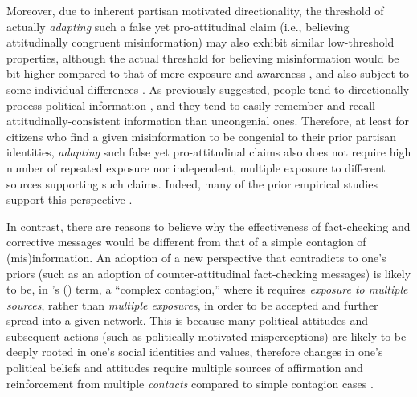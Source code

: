 \documentclass[man, 12pt, a4paper, noextraspace]{apa6}
\begin{document}
    Moreover, due to inherent partisan motivated directionality, the threshold of actually \emph{adapting} such a false yet pro-attitudinal claim (i.e., believing attitudinally congruent misinformation) may also exhibit similar low-threshold properties, although the actual threshold for believing misinformation would be bit higher compared to that of mere exposure and awareness \parencite[e.g.,][]{Monsted_plos2017}, and also subject to some individual differences \parencite[e.g.,][]{weeks2015emotions}. As previously suggested, people tend to directionally process political information \parencite{taber2006}, and they tend to easily remember and recall attitudinally-consistent information than uncongenial ones. Therefore, at least for citizens who find a given misinformation to be congenial to their prior partisan identities, \emph{adapting} such false yet pro-attitudinal claims also does not require high number of repeated exposure nor independent, multiple exposure to different sources supporting such claims. Indeed, many of the prior empirical studies support this perspective \parencite[e.g.,][]{garrett2016driving, kuklinski2000misinformation, flynn2017nature}.         
    
    In contrast, there are reasons to believe why the effectiveness of fact-checking and corrective messages would be different from that of a simple contagion of (mis)information. An adoption of a new perspective that contradicts to one's priors (such as an adoption of counter-attitudinal fact-checking messages) is likely to be, in \citeauthor{centola2007complex}'s (\citeyear{centola2007complex}) term, a \enquote{complex contagion,} where it requires \emph{exposure to multiple sources}, rather than \emph{multiple exposures}, in order to be accepted and further spread into a given network. This is because many political attitudes and subsequent actions (such as politically motivated misperceptions) are likely to be deeply rooted in one’s social identities and values, therefore changes in one's political beliefs and attitudes require multiple sources of affirmation and reinforcement from multiple \emph{contacts} compared to simple contagion cases \parencite[e.g.,][]{gonzalez2011dynamics, larson2016social, siegel2009social}. 
    
\end{document}
